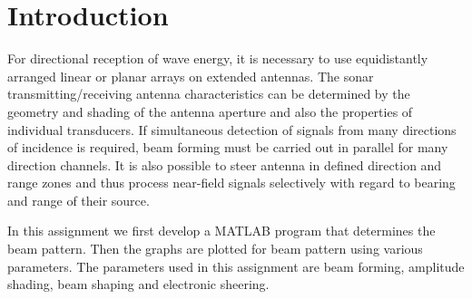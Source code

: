  \chapter*{Introduction}

\noindent For directional reception of wave energy, it is necessary to use equidistantly arranged linear or planar arrays on extended antennas. The sonar transmitting/receiving antenna characteristics can be determined by the geometry and shading of the antenna aperture and also the properties of individual transducers. If simultaneous detection of signals from many directions of incidence is required, beam forming must be carried out in parallel
for many direction channels. It is also possible to steer antenna in defined direction and range zones and thus process near-field signals selectively with regard to bearing and range of their source.


\noindent In this assignment we first develop a MATLAB program that determines the beam pattern. Then the graphs are plotted for beam pattern using various parameters. The parameters used in this assignment are beam forming, amplitude shading, beam shaping and electronic sheering.


